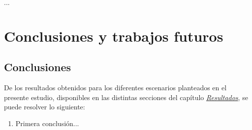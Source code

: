 \documentclass[IB,BIB]{TFUOC}%
\begin{document}

...




\chapter{Conclusiones y trabajos futuros}
\label{chap:Conclusiones y trabajos futuros}

\section{Conclusiones}
\label{sec:Conclusiones}

% 

De los resultados obtenidos para los diferentes escenarios planteados en el presente estudio, disponibles en las distintas secciones del capítulo \textit{\hyperref[chap:Resultados]{Resultados}}, se puede resolver lo siguiente:

\begin{enumerate}[label=\textnormal{(\Roman*)}]
\item \label{th1} Primera conclusión...
\end{enumerate}
\end{document}
